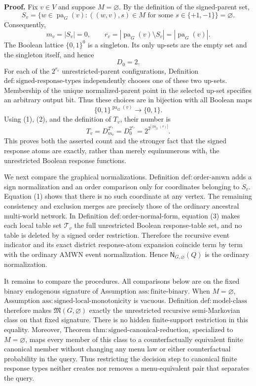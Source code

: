 \textbf{Proof.}
Fix \(v\in V\) and suppose \(M=\varnothing\). By the definition of the signed-parent set,
\[
 S_v
 =\{w\in\operatorname{pa}_G(v):((w,v),s)\in M
       \text{ for some }s\in\{+1,-1\}\}
 =\varnothing.
\]
Consequently,
\[
 m_v=|S_v|=0,
 \qquad
 r_v=|\operatorname{pa}_G(v)\setminus S_v|
     =|\operatorname{pa}_G(v)|.
\tag{1}
\]
The Boolean lattice \(\{0,1\}^{0}\) is a singleton. Its only up-sets are the empty set and the singleton itself, and hence
\[
 D_0=2.
\tag{2}
\]
For each of the \(2^{r_v}\) unrestricted-parent configurations, Definition \(\mathrm{def:signed\text{-}response\text{-}types}\) independently chooses one of these two up-sets. Membership of the unique normalized-parent point in the selected up-set specifies an arbitrary output bit. Thus these choices are in bijection with all Boolean maps
\[
 \{0,1\}^{\operatorname{pa}_G(v)}\longrightarrow\{0,1\}.
\]
Using (1), (2), and the definition of \(T_v\), their number is
\[
 T_v
 =D_{m_v}^{2^{r_v}}
 =D_0^{2^{r_v}}
 =2^{2^{|\operatorname{pa}_G(v)|}}.
\tag{3}
\]
This proves both the asserted count and the stronger fact that the signed response atoms are exactly, rather than merely equinumerous with, the unrestricted Boolean response functions.

We next compare the graphical normalizations. Definition \(\mathrm{def:order\text{-}amwn}\) adds a sign normalization and an order comparison only for coordinates belonging to \(S_v\). Equation (1) shows that there is no such coordinate at any vertex. The remaining consistency and exclusion merges are precisely those of the ordinary ancestral multi-world network. In Definition \(\mathrm{def:order\text{-}normal\text{-}form}\), equation (3) makes each local table set \(\mathcal T_v\) the full unrestricted Boolean response-table set, and no table is deleted by a signed order restriction. Therefore the recursive event indicator and its exact district response-atom expansion coincide term by term with the ordinary AMWN event normalization. Hence \(\mathsf N_{G,\varnothing}(Q)\) is the ordinary normalization.

It remains to compare the procedures. All comparisons below are on the fixed binary endogenous signature of Assumption \(\mathrm{ass:finite\text{-}binary}\). When \(M=\varnothing\), Assumption \(\mathrm{ass:signed\text{-}local\text{-}monotonicity}\) is vacuous. Definition \(\mathrm{def:model\text{-}class}\) therefore makes \(\mathfrak M(G,\varnothing)\) exactly the unrestricted recursive semi-Markovian class on that fixed signature. There is no hidden finite-support restriction in this equality. Moreover, Theorem \(\mathrm{thm:signed\text{-}canonical\text{-}reduction}\), specialized to \(M=\varnothing\), maps every member of this class to a counterfactually equivalent finite canonical member without changing any menu law or either counterfactual probability in the query. Thus restricting the decision step to canonical finite response types neither creates nor removes a menu-equivalent pair that separates the query.

